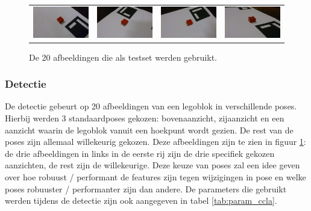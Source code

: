 \begin{figure}
\begin{tabular}{cccc}
\includegraphics[width=0.25\linewidth]{img/classTestImg/17_rand} &   \includegraphics[width=0.25\linewidth]{img/classTestImg/18_rand} & \includegraphics[width=0.25\linewidth]{img/classTestImg/19_rand} &
\includegraphics[width=0.25\linewidth]{img/classTestImg/20_rand} \\
\end{tabular}
\caption{De 20 afbeeldingen die als testset werden gebruikt.}
\label{fig:testset}
\end{figure}

\subsubsection*{Detectie}

De detectie gebeurt op 20 afbeeldingen van een legoblok in verschillende poses. Hierbij werden 3 standaardposes gekozen: bovenaanzicht, zijaanzicht en een aanzicht waarin de legoblok vanuit een hoekpunt wordt gezien. De rest van de poses zijn allemaal willekeurig gekozen. Deze afbeeldingen zijn te zien in figuur \ref{fig:testset}: de drie afbeeldingen in links in de eerste rij zijn de drie specifiek gekozen aanzichten, de rest zijn de willekeurige. Deze keuze van poses zal een idee geven over hoe robuust / performant de features zijn tegen wijzigingen in pose en welke poses robuuster / performanter zijn dan andere. De parameters die gebruikt werden tijdens de detectie zijn ook aangegeven in tabel \ref{tab:param_ccla}.

